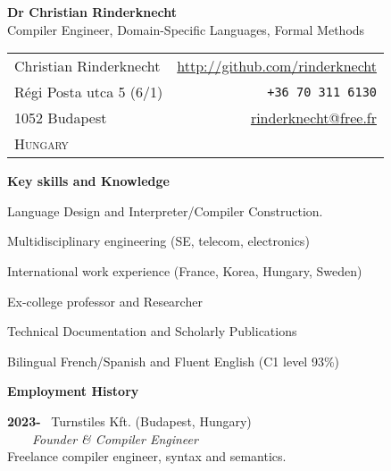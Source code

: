 \documentclass[a4paper,11pt]{article}
\begin{document}
\begin{center}
\textbf{\LARGE Dr Christian Rinderknecht}\\[5mm]
{\large Compiler Engineer, Domain-Specific Languages, Formal Methods}
\end{center}

\noindent
\begin{tabular}{@{}l@{\qquad\qquad\qquad\qquad}r@{}}
  Christian Rinderknecht
& \url{http://github.com/rinderknecht}\\
  Régi Posta utca 5 (6/1)
& \texttt{+36 70 311 6130}\\
  1052 Budapest
& \url{rinderknecht@free.fr}\\
  \textsc{Hungary}
&
\end{tabular}

\medskip


\pagestyle{empty}

\bigskip
\noindent\textbf{\large Key skills and Knowledge}
\begin{itemize*}

  \item Language Design and Interpreter/Compiler Construction.

  \item Multidisciplinary engineering (SE, telecom, electronics)


  \item International work experience (France, Korea, Hungary, Sweden)

  \item Ex-college professor and Researcher

  \item Technical Documentation and Scholarly Publications

  \item Bilingual French/Spanish and Fluent English (C1 level 93\%)

\end{itemize*}

\smallskip
\noindent\textbf{\large Employment History}
\bigskip

\noindent\textbf{2023-} \ \textsf{Turnstiles Kft.} (Budapest,
Hungary)\\ \ \ \ \ \emph{Founder \& Compiler Engineer}\\
Freelance compiler engineer, syntax and semantics.
\end{document}
